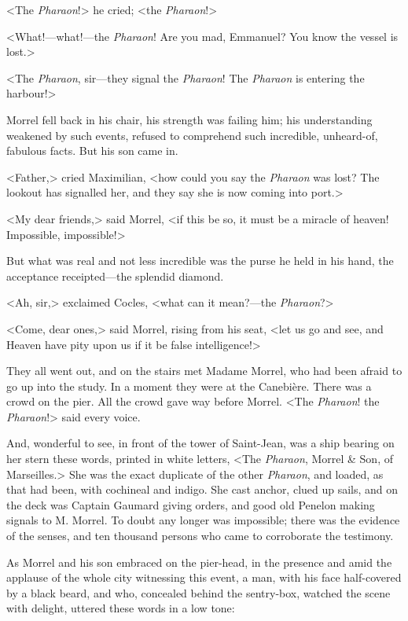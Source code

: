  <The \textit{Pharaon}!> he cried; <the \textit{Pharaon}!> 

 <What!—what!—the \textit{Pharaon}! Are you mad, Emmanuel? You know the vessel is lost.> 

 <The \textit{Pharaon}, sir—they signal the \textit{Pharaon}! The \textit{Pharaon} is entering the harbour!> 

 Morrel fell back in his chair, his strength was failing him; his understanding weakened by such events, refused to comprehend such incredible, unheard-of, fabulous facts. But his son came in. 

 <Father,> cried Maximilian, <how could you say the \textit{Pharaon} was lost? The lookout has signalled her, and they say she is now coming into port.>

<My dear friends,> said Morrel, <if this be so, it must be a miracle of heaven! Impossible, impossible!> 

 But what was real and not less incredible was the purse he held in his hand, the acceptance receipted—the splendid diamond. 

 <Ah, sir,> exclaimed Cocles, <what can it mean?—the \textit{Pharaon}?> 

 <Come, dear ones,> said Morrel, rising from his seat, <let us go and see, and Heaven have pity upon us if it be false intelligence!> 

 They all went out, and on the stairs met Madame Morrel, who had been afraid to go up into the study. In a moment they were at the Canebière. There was a crowd on the pier. All the crowd gave way before Morrel. <The \textit{Pharaon}! the \textit{Pharaon}!> said every voice. 

 And, wonderful to see, in front of the tower of Saint-Jean, was a ship bearing on her stern these words, printed in white letters, <The \textit{Pharaon}, Morrel \& Son, of Marseilles.> She was the exact duplicate of the other \textit{Pharaon}, and loaded, as that had been, with cochineal and indigo. She cast anchor, clued up sails, and on the deck was Captain Gaumard giving orders, and good old Penelon making signals to M. Morrel. To doubt any longer was impossible; there was the evidence of the senses, and ten thousand persons who came to corroborate the testimony. 

 As Morrel and his son embraced on the pier-head, in the presence and amid the applause of the whole city witnessing this event, a man, with his face half-covered by a black beard, and who, concealed behind the sentry-box, watched the scene with delight, uttered these words in a low tone: 

